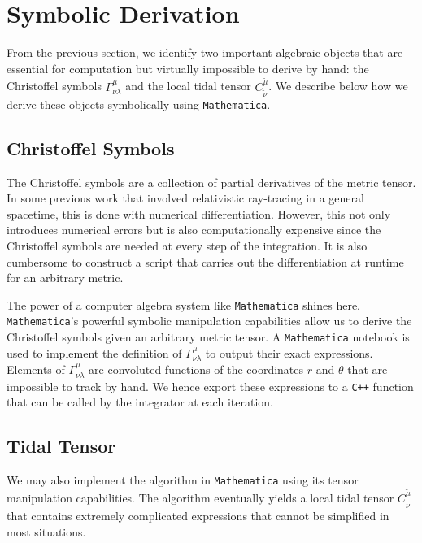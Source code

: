 \documentclass[11pt, twocolumn]{article}
\begin{document}
\section{Symbolic Derivation} \label{sec:symbolic}


From the previous section, we identify two important algebraic objects that are essential for computation but virtually impossible to derive by hand: the Christoffel symbols $\Gamma^{\mu}_{\nu\lambda}$ and the local tidal tensor $C^{\tilde{\mu}}_{\tilde{\nu}}$. We describe below how we derive these objects symbolically using \texttt{Mathematica}.


\subsection{Christoffel Symbols}


The Christoffel symbols are a collection of partial derivatives of the metric tensor. In some previous work \cite{Abdikamalov2019} that involved relativistic ray-tracing in a general spacetime, this is done with numerical differentiation. However, this not only introduces numerical errors but is also computationally expensive since the Christoffel symbols are needed at every step of the integration. It is also cumbersome to construct a script that carries out the differentiation at runtime for an arbitrary metric.

The power of a computer algebra system like \texttt{Mathematica} shines here. \texttt{Mathematica}'s powerful symbolic manipulation capabilities allow us to derive the Christoffel symbols given an arbitrary metric tensor. A \texttt{Mathematica} notebook is used to implement the definition of $\Gamma^{\mu}_{\nu\lambda}$ to output their exact expressions. Elements of $\Gamma^{\mu}_{\nu\lambda}$ are convoluted functions of the coordinates $r$ and $\theta$ that are impossible to track by hand. We hence export these expressions to a \texttt{C++} function that can be called by the integrator at each iteration.


\subsection{Tidal Tensor}


We may also implement the algorithm in \texttt{Mathematica} using its tensor manipulation capabilities. The algorithm eventually yields a local tidal tensor $C^{\tilde{\mu}}_{\tilde{\nu}}$ that contains extremely complicated expressions that cannot be simplified in most situations.
\end{document}
